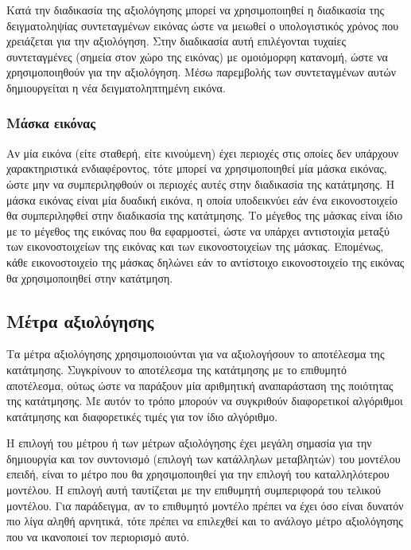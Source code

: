 \documentclass[a4paper,12pt]{article}
\begin{document}
Κατά την διαδικασία της αξιολόγησης μπορεί να χρησιμοποιηθεί η διαδικασία της
δειγματοληψίας συντεταγμένων εικόνας ώστε να μειωθεί ο υπολογιστικός χρόνος που
χρειάζεται για την αξιολόγηση. Στην διαδικασία αυτή επιλέγονται τυχαίες
συντεταγμένες (σημεία στον χώρο της εικόνας) με ομοιόμορφη κατανομή, ώστε να
χρησιμοποιηθούν για την αξιολόγηση. Μέσω παρεμβολής των συντεταγμένων αυτών
δημιουργείται η νέα δειγματοληπτημένη εικόνα.

\subsubsection{Μάσκα εικόνας}

Αν μία εικόνα (είτε σταθερή, είτε κινούμενη) έχει περιοχές στις οποίες δεν
υπάρχουν χαρακτηριστικά ενδιαφέροντος, τότε μπορεί να χρησιμοποιηθεί μία μάσκα
εικόνας, ώστε μην να συμπεριληφθούν οι περιοχές αυτές στην διαδικασία της
κατάτμησης. Η μάσκα εικόνας είναι μία δυαδική εικόνα, η οποία υποδεικνύει εάν
ένα εικονοστοιχείο θα συμπεριληφθεί στην διαδικασία της κατάτμησης. Το μέγεθος
της μάσκας είναι ίδιο με το μέγεθος της εικόνας που θα εφαρμοστεί, ώστε να
υπάρχει αντιστοιχία μεταξύ των εικονοστοιχείων της εικόνας και των
εικονοστοιχείων της μάσκας. Επομένως, κάθε εικονοστοιχείο της μάσκας δηλώνει εάν
το αντίστοιχο εικονοστοιχείο της εικόνας θα χρησιμοποιηθεί στην κατάτμηση.

\subsection{Μέτρα αξιολόγησης}

Τα μέτρα αξιολόγησης χρησιμοποιούνται για να αξιολογήσουν το αποτέλεσμα της
κατάτμησης. Συγκρίνουν το αποτέλεσμα της κατάτμησης με το επιθυμητό αποτέλεσμα,
ούτως ώστε να παράξουν μία αριθμητική αναπαράσταση της ποιότητας της κατάτμησης.
Με αυτόν το τρόπο μπορούν να συγκριθούν διαφορετικοί αλγόριθμοι κατάτμησης και
διαφορετικές τιμές για τον ίδιο αλγόριθμο.

Η επιλογή του μέτρου ή των μέτρων αξιολόγησης έχει μεγάλη σημασία για την
δημιουργία και τον συντονισμό (επιλογή των κατάλληλων μεταβλητών) του μοντέλου
επειδή, είναι το μέτρο που θα χρησιμοποιηθεί για την επιλογή του καταλληλότερου
μοντέλου. Η επιλογή αυτή ταυτίζεται με την επιθυμητή συμπεριφορά του τελικού
μοντέλου. Για παράδειγμα, αν το επιθυμητό μοντέλο πρέπει να έχει όσο είναι
δυνατόν πιο λίγα αληθή αρνητικά, τότε πρέπει να επιλεχθεί και το ανάλογο μέτρο
αξιολόγησης που να ικανοποιεί τον περιορισμό αυτό.
\end{document}
